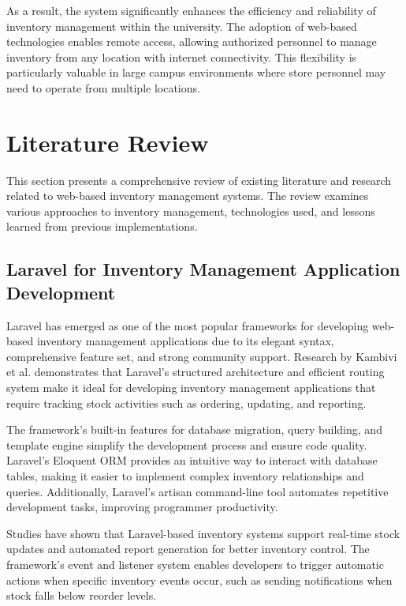 As a result, the system significantly enhances the efficiency and reliability of inventory management within the university. The adoption of web-based technologies enables remote access, allowing authorized personnel to manage inventory from any location with internet connectivity. This flexibility is particularly valuable in large campus environments where store personnel may need to operate from multiple locations.

\section{Literature Review}

This section presents a comprehensive review of existing literature and research related to web-based inventory management systems. The review examines various approaches to inventory management, technologies used, and lessons learned from previous implementations.

\subsection{Laravel for Inventory Management Application Development}

Laravel has emerged as one of the most popular frameworks for developing web-based inventory management applications due to its elegant syntax, comprehensive feature set, and strong community support. Research by Kambivi et al. \cite{laravel_pos} demonstrates that Laravel's structured architecture and efficient routing system make it ideal for developing inventory management applications that require tracking stock activities such as ordering, updating, and reporting.

The framework's built-in features for database migration, query building, and template engine simplify the development process and ensure code quality. Laravel's Eloquent ORM provides an intuitive way to interact with database tables, making it easier to implement complex inventory relationships and queries. Additionally, Laravel's artisan command-line tool automates repetitive development tasks, improving programmer productivity.

Studies have shown that Laravel-based inventory systems support real-time stock updates and automated report generation for better inventory control. The framework's event and listener system enables developers to trigger automatic actions when specific inventory events occur, such as sending notifications when stock falls below reorder levels.

